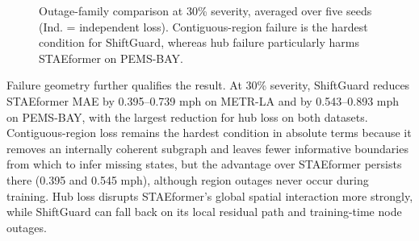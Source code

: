 \documentclass[preprint,12pt]{elsarticle}
\begin{document}
\begin{figure}[t]
  \centering
  \caption{Outage-family comparison at 30\% severity, averaged over five seeds
  (Ind. = independent loss).
  Contiguous-region failure is the hardest condition for ShiftGuard, whereas
  hub failure particularly harms STAEformer on PEMS-BAY.}
  \label{fig:outage-family}
\end{figure}

Failure geometry further qualifies the result. At 30\% severity, ShiftGuard
reduces STAEformer MAE by 0.395--0.739 mph on METR-LA and by 0.543--0.893 mph on
PEMS-BAY, with the largest reduction for hub loss on both datasets.
Contiguous-region loss remains the hardest condition in absolute terms because
it removes an internally coherent subgraph and leaves fewer informative
boundaries from which to infer missing states, but the advantage over
STAEformer persists there (0.395 and 0.545 mph), although region outages never
occur during training. Hub loss disrupts STAEformer's global spatial
interaction more strongly, while ShiftGuard can fall back on its local residual
path and training-time node outages.

\FloatBarrier
\end{document}
